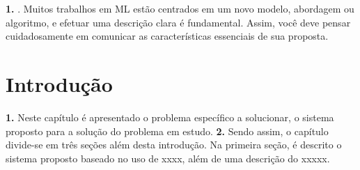 
\textbf{1. }. Muitos trabalhos em ML estão centrados em um novo modelo, abordagem ou algoritmo, e efetuar uma descrição clara é fundamental. Assim, você deve pensar cuidadosamente em comunicar as características essenciais de sua proposta.

\section{Introdução}

\textbf{1. }
Neste capítulo é apresentado o problema específico a solucionar, o sistema proposto para a solução do problema em estudo.
\textbf{2. }
Sendo assim, o capítulo divide-se em três seções além desta introdução. 
Na primeira seção, é descrito o sistema proposto baseado no uso de xxxx, além de uma descrição do xxxxx.
